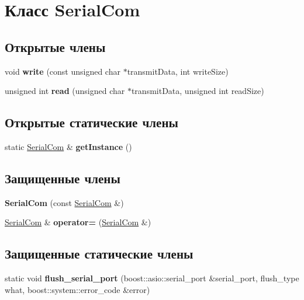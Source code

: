 \hypertarget{classSerialCom}{}\section{Класс Serial\+Com}
\label{classSerialCom}
\subsection*{Открытые члены}
\begin{DoxyCompactItemize}
\item 
\mbox{\label{classSerialCom_ab0fe0b96216373e8f8f1c21237f3816e}} 
void {\bfseries write} (const unsigned char $\ast$transmit\+Data, int write\+Size)
\item 
\mbox{\label{classSerialCom_a519329985c4b1007930fe75d441facef}} 
unsigned int {\bfseries read} (unsigned char $\ast$transmit\+Data, unsigned int read\+Size)
\end{DoxyCompactItemize}
\subsection*{Открытые статические члены}
\begin{DoxyCompactItemize}
\item 
\mbox{\label{classSerialCom_ad20b8499de78afdeed41f0494d03f72c}} 
static \hyperlink{classSerialCom}{Serial\+Com} \& {\bfseries get\+Instance} ()
\end{DoxyCompactItemize}
\subsection*{Защищенные члены}
\begin{DoxyCompactItemize}
\item 
\mbox{\label{classSerialCom_ac29520ce005613d3fb487e75bbd5e833}} 
{\bfseries Serial\+Com} (const \hyperlink{classSerialCom}{Serial\+Com} \&)
\item 
\mbox{\label{classSerialCom_ae60739c5f6d1129feb980891a5013a00}} 
\hyperlink{classSerialCom}{Serial\+Com} \& {\bfseries operator=} (\hyperlink{classSerialCom}{Serial\+Com} \&)
\end{DoxyCompactItemize}
\subsection*{Защищенные статические члены}
\begin{DoxyCompactItemize}
\item 
\mbox{\label{classSerialCom_a2700df9ffb1cfbc2f6bf32064abcbee3}} 
static void {\bfseries flush\+\_\+serial\+\_\+port} (boost\+::asio\+::serial\+\_\+port \&serial\+\_\+port, flush\+\_\+type what, boost\+::system\+::error\+\_\+code \&error)
\end{DoxyCompactItemize}
